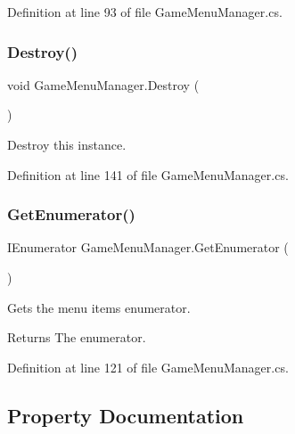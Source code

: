 Definition at line 93 of file Game\+Menu\+Manager.\+cs.

\mbox{\label{class_game_menu_manager_a005762272c62660d9c013e33ef671487}} 
\subsubsection{\texorpdfstring{Destroy()}{Destroy()}}
{\footnotesize\ttfamily void Game\+Menu\+Manager.\+Destroy (\begin{DoxyParamCaption}{ }\end{DoxyParamCaption})}



Destroy this instance. 



Definition at line 141 of file Game\+Menu\+Manager.\+cs.

\mbox{\label{class_game_menu_manager_ad13751caaa9d6728f8ac465ba27b06f9}} 
\subsubsection{\texorpdfstring{Get\+Enumerator()}{GetEnumerator()}}
{\footnotesize\ttfamily I\+Enumerator Game\+Menu\+Manager.\+Get\+Enumerator (\begin{DoxyParamCaption}{ }\end{DoxyParamCaption})}



Gets the menu items enumerator. 

\begin{DoxyReturn}{Returns}
The enumerator.
\end{DoxyReturn}


Definition at line 121 of file Game\+Menu\+Manager.\+cs.



\subsection{Property Documentation}
\mbox{\label{class_game_menu_manager_ad98a6509494a0988d2cc845e3b8cc089}} 
